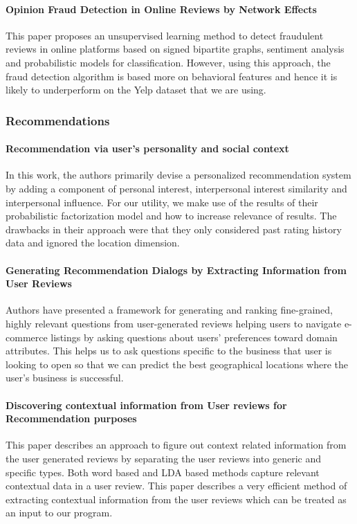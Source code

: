 \documentclass[12pt]{article} %
\begin{document}
\paragraph{Opinion Fraud Detection in Online Reviews by Network Effects} 
This paper proposes an unsupervised learning method to detect fraudulent reviews in online platforms based on signed bipartite graphs, sentiment analysis and probabilistic models for classification. However, using this approach, the fraud detection algorithm is based more on behavioral features and hence it is likely to underperform on the Yelp dataset that we are using.

\subsubsection{Recommendations}

\paragraph{Recommendation via user's personality and social context}
In this work, the authors primarily devise a personalized recommendation system by adding a component of personal interest, interpersonal interest similarity and interpersonal influence. For our utility, we make use of the results of their probabilistic factorization model and how to increase relevance of results. The drawbacks in their approach were that they only considered past rating history data and ignored the location dimension.

\paragraph{Generating Recommendation Dialogs by Extracting Information from User Reviews} 
Authors have presented a framework for generating and ranking fine-grained, highly relevant questions from user-generated reviews helping users to navigate e-commerce listings by asking questions about users' preferences toward domain attributes. This helps us to ask questions specific to the business that user is looking to open so that we can predict the best geographical locations where the user's business is successful.

\paragraph{Discovering contextual information from User reviews for Recommendation purposes}
This paper describes an approach to figure out context related information from the user generated reviews by separating the user reviews into generic and specific types. Both word based and LDA based methods capture relevant contextual data in a user review. This paper describes a very efficient method of extracting contextual information from the user reviews which can be treated as an input to our program.
\end{document}
